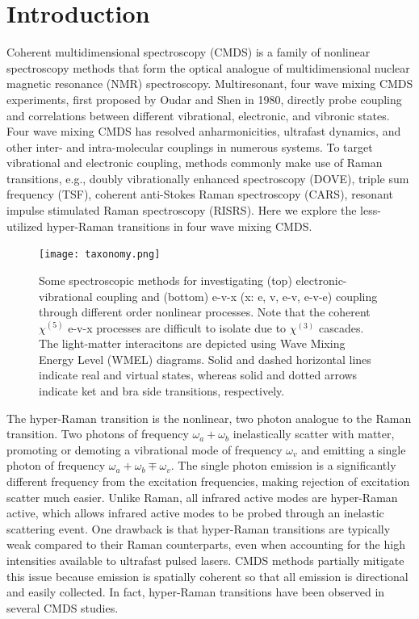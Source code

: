 \documentclass[aip, jcp, reprint, twocolumn]{revtex4-2}
\begin{document}
\section{Introduction}
Coherent multidimensional spectroscopy (CMDS) is a family of nonlinear spectroscopy methods that form the optical analogue of multidimensional nuclear magnetic resonance (NMR) spectroscopy.\cite{Cho2008}
Multiresonant, four wave mixing CMDS experiments, first proposed by Oudar and Shen in 1980,\cite{RN307} directly probe coupling and correlations between different vibrational, electronic, and vibronic states. \cite{RN281, RN103, Cho2008} 
Four wave mixing CMDS has resolved anharmonicities, ultrafast dynamics, and other inter- and intra-molecular couplings in numerous systems. \cite{Cho2008, Gaynor2017, Ziegler2018, Ogilvie2019, Bonn2021, RN325}
To target vibrational and electronic coupling, methods commonly make use of Raman transitions, e.g., doubly vibrationally enhanced spectroscopy (DOVE), triple sum frequency (TSF), coherent anti-Stokes Raman spectroscopy (CARS), resonant impulse stimulated Raman spectroscopy (RISRS).\cite{RN103, Dhar1994, RN345, Cho2000, RN491}
Here we explore the less-utilized hyper-Raman transitions in four wave mixing CMDS.


\begin{figure}[!htbp]
	\centering
	\texttt{[image: taxonomy.png]}
	\caption{
		Some spectroscopic methods for investigating (top) electronic-vibrational coupling and (bottom) e-v-x (x: e, v, e-v, e-v-e) coupling through different order nonlinear processes.
		Note that the coherent $\chi^{(5)}$ e-v-x processes are difficult to isolate due to $\chi^{(3)}$ cascades. 
		The light-matter interacitons are depicted using Wave Mixing Energy Level (WMEL) diagrams.\cite{RN286}
		Solid and dashed horizontal lines indicate real and virtual states, whereas solid and dotted arrows indicate ket and bra side transitions, respectively. 
	}
	\label{fig:comparisonwmel}
\end{figure}

The hyper-Raman transition is the nonlinear, two photon analogue to the Raman transition.\cite{Terhune1965, Cyvin1965, Andrews1978}
Two photons of frequency $\omega_a+\omega_b$ inelastically scatter with matter, promoting or demoting a vibrational mode of frequency $\omega_v$ and emitting a single photon of frequency $\omega_a + \omega_b \mp \omega_v$. 
The single photon emission is a significantly different frequency from the excitation frequencies, making rejection of excitation scatter much easier.
Unlike Raman, all infrared active modes are hyper-Raman active, which allows infrared active modes to be probed through an inelastic scattering event. \cite{Andrews1978}
One drawback is that hyper-Raman transitions are typically weak compared to their Raman counterparts, even when accounting for the high intensities available to ultrafast pulsed lasers.\cite{RN515, Kelley2010}
CMDS methods partially mitigate this issue because emission is spatially coherent so that all emission is directional and easily collected.
In fact, hyper-Raman transitions have been observed in several CMDS studies.\cite{Zilian1994, RN350, RN416, RN351, RN352, RN353, Chen1998, RN362, RN418, Wang2021, Bonn2024, McDonnell2024}
\end{document}
